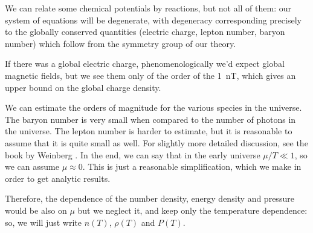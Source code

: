 \documentclass[main.tex]{subfiles}
\begin{document}
%
%



We can relate some chemical potentials by reactions, but not all of them: our system of equations will be degenerate, with degeneracy corresponding precisely to the globally conserved quantities (electric charge, lepton number, baryon number) which follow from the symmetry group of our theory.

If there was a global electric charge, phenomenologically we'd expect global magnetic fields, but we see them only of the order of the \SI{1}{nT}, which gives an upper bound on the global charge density.

We can estimate the orders of magnitude for the various species in the universe.
The baryon number is very small when compared to the number of photons in the universe. The lepton number is harder to estimate, but it is reasonable to assume that it is quite small as well. For slightly more detailed discussion, see the book by Weinberg \cite[before eq. 15.6.5]{weinbergGravitationCosmologyPrinciples1972}.
In the end, we can say that in the early universe \(\mu / T \ll 1\), so we can assume \(\mu \approx 0\).
This is just a reasonable simplification, which we make in order to get analytic results. 

Therefore, the dependence of the number density, energy density and pressure would be also on \(\mu \) but we neglect it, and keep only the temperature dependence: so, we will just write \(n(T)\), \(\rho (T)\) and \(P(T)\).

\end{document}
